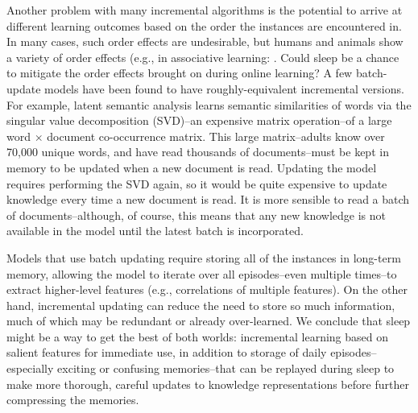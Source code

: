 \documentclass[10pt,letterpaper]{article}
\begin{document}
Another problem with many incremental algorithms is the potential to arrive at different learning outcomes based on the order the instances are encountered in. In many cases, such order effects are undesirable, but humans and animals show a variety of order effects (e.g., in associative learning: . Could sleep be a chance to mitigate the order effects brought on during online learning? A few batch-update models have been found to have roughly-equivalent incremental versions. For example, latent semantic analysis \cite[LSA]{Deerwester:1990} learns semantic similarities of words via the singular value decomposition (SVD)--an expensive matrix operation--of a large word $\times$ document co-occurrence matrix. This large matrix--adults know over 70,000 unique words, and have read thousands of documents--must be kept in memory to be updated when a new document is read. Updating the model requires performing the SVD again, so it would be quite expensive to update knowledge every time a new document is read. It is more sensible to read a batch of documents--although, of course, this means that any new knowledge is not available in the model until the latest batch is incorporated.

Models that use batch updating require storing all of the instances in long-term memory, allowing the model to iterate over all episodes--even multiple times--to extract higher-level features (e.g., correlations of multiple features). On the other hand, incremental updating can reduce the need to store so much information, much of which may be redundant or already over-learned. We conclude that sleep might be a way to get the best of both worlds: incremental learning based on salient features for immediate use, in addition to storage of daily episodes--especially exciting or confusing memories--that can be replayed during sleep to make more thorough, careful updates to knowledge representations before further compressing the memories.

\vspace{-.2cm}
\end{document}
